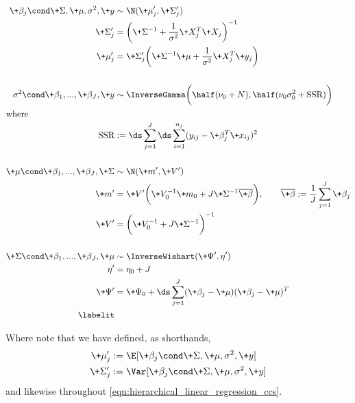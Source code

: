 \documentclass{article} %
\begin{document}
\begin{align*}
\+\beta_j \cond \+\Sigma,  \+\mu, \sigma^2,  \+y & \sim  \N(\+\mu_j^\prime,  \+\Sigma_j^\prime) \\
\+\Sigma_j^\prime &= \bigg( \+\Sigma^{-1} + \frac{1}{\sigma^2} \+X_j^T \+X_j \bigg)^{-1} \\
\+\mu_j^\prime &= \+\Sigma_j^\prime \bigg( \+\Sigma^{-1} \+\mu + \frac{1}{\sigma^2} \+X_j^T \+y_j \bigg) \\
& \\ 
\sigma^2 \cond \+\beta_1, ...,\+\beta_J,  \+y & \sim \InverseGamma
\bigg( \half (\nu_0 + N),  \half (\nu_0 \sigma_0^2 + \text{SSR})\bigg) \\
\intertext{where}
\text{SSR} &:= \ds\sum_{j=1}^J \ds\sum_{i=1}^{n_j}  (y_{ij} - \+\beta_j^T \+x_{ij})^2 \\
& \\ 
\+\mu \cond  \+\beta_1, ...,\+\beta_J,  \+\Sigma &\sim \N(\+m^\prime,  \+V^\prime) \\
\+m^\prime &= \+V^\prime \bigg( \+V_0^{-1} \+m_0 + J \+\Sigma^{-1} \overline{\+\beta} \bigg),  \quad \quad \overline{\+\beta} := \frac{1}{J} \sum_{j=1}^J \+\beta_j \\ 
\+V^\prime &=  \bigg( \+V_0^{-1} + J \+\Sigma^{-1} \bigg)^{-1} \\
& \\ 
\+\Sigma \cond \+\beta_1, ...,\+\beta_J,  \+\mu &\sim \InverseWishart (\+\Psi^\prime, \eta^\prime) \\
\eta^\prime &= \eta_0 + J \\
\+\Psi^\prime &= \+\Psi_0 + \ds\sum_{j=1}^J (\+\beta_j - \+\mu) (\+\beta_j -\+\mu)^T \\
\labelit \label{eqn:hierarchical_linear_regression_ccs}
\end{align*}

Where note that we have defined,  as shorthands,  
\begin{align*}
\+\mu_j^\prime  & := \E [ \+\beta_j \cond \+\Sigma, \+\mu, \sigma^2, \+y] \\
\+\Sigma_j^\prime  & := \Var [ \+\beta_j \cond \+\Sigma, \+\mu, \sigma^2, \+y] \\
\end{align*}
and likewise throughout \eqref{eqn:hierarchical_linear_regression_ccs}. 
\end{document}
